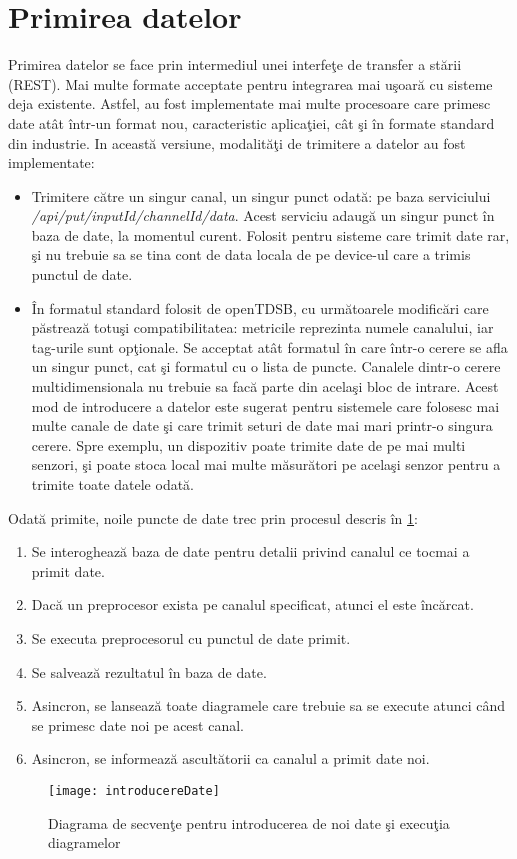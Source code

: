 \section{Primirea datelor}
Primirea datelor se face prin intermediul unei interfeţe de transfer a stării (REST). Mai multe formate acceptate pentru integrarea mai uşoară cu sisteme deja existente. Astfel, au fost implementate mai multe procesoare care primesc date atât într-un format nou, caracteristic aplicaţiei, cât şi în formate standard din industrie.
In această versiune, modalităţi de trimitere a datelor au fost implementate:
\begin{itemize}
	\item Trimitere către un singur canal, un singur punct odată: pe baza serviciului\\ \textit{/api/put/{inputId}/{channelId}/{data}}. Acest serviciu adaugă un singur punct în baza de date, la momentul curent. Folosit pentru sisteme care trimit date rar, şi nu trebuie sa se tina cont de data locala de pe device-ul care a trimis punctul de date.
	\item În formatul standard folosit de openTDSB, cu următoarele modificări care păstrează totuşi compatibilitatea: metricile reprezinta numele canalului, iar tag-urile sunt opţionale. Se acceptat atât formatul în care într-o cerere se afla un singur punct, cat şi formatul cu o lista de puncte. Canalele dintr-o cerere multidimensionala nu trebuie sa facă parte din acelaşi bloc de intrare. Acest mod de introducere a datelor este sugerat pentru sistemele care folosesc mai multe canale de date şi care trimit seturi de date mai mari printr-o singura cerere. Spre exemplu, un dispozitiv poate trimite date de pe mai multi senzori, şi poate stoca local mai multe măsurători pe acelaşi senzor pentru a trimite toate datele odată.
\end{itemize}
Odată primite, noile puncte de date trec prin procesul descris în \cref{fig:intrareDate}:
\begin{enumerate}
	\item Se interoghează baza de date pentru detalii privind canalul ce tocmai a primit date.
	\item Dacă un preprocesor exista pe canalul specificat, atunci el este încărcat.
	\item Se executa preprocesorul cu punctul de date primit.
	\item Se salvează rezultatul în baza de date.
	\item Asincron, se lansează toate diagramele care trebuie sa se execute atunci când se primesc date noi pe acest canal.
	\item Asincron, se informează ascultătorii ca canalul a primit date noi.
\end{enumerate}
\begin{landscape}
	\begin{figure}
		\centering
		\texttt{[image: introducereDate]}
		\caption{Diagrama de secvenţe pentru introducerea de noi date şi execuţia diagramelor}
		\label{fig:intrareDate}
	\end{figure}
\end{landscape}
